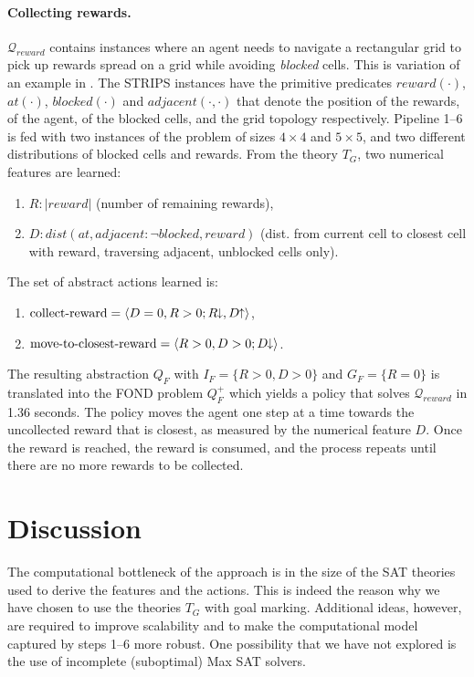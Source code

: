 \documentclass[letterpaper]{article} %
\newcommand{\tup}[1]{\langle #1 \rangle}
\newcommand{\abs}[1]{\ensuremath{\left\vert{#1}\right\vert}}
\newcommand{\Q}{\mathcal{Q}}
\newcommand{\abst}[2]{\tup{#1;#2}}
\newcommand{\pplus}{\hspace{-.05em}\raisebox{.15ex}{\footnotesize$\uparrow$}}
\newcommand{\mminus}{\hspace{-.05em}\raisebox{.15ex}{\footnotesize$\downarrow$}}
\begin{document}
\paragraph{Collecting rewards.}
$\Q_{reward}$ contains instances where  an agent needs to navigate a rectangular
grid to pick up  rewards spread on a grid  while 
avoiding \emph{blocked} cells. This is  variation of an
example  in \cite{garnelo2016towards}. The STRIPS instances have the primitive predicates $reward(\cdot)$, $at(\cdot)$, $blocked(\cdot)$
and $adjacent(\cdot,\cdot)$ that denote the position of the rewards, of
the agent, of the blocked cells, and the grid topology respectively.
Pipeline 1--6  is fed with two instances of the problem of sizes $4 \times 4$
and $5\times 5$, and two different  distributions of blocked cells  and rewards.
From the theory $T_G$, two numerical  features are learned:
\begin{enumerate}[--]
  \item $R: \abs{reward}$ (number of remaining rewards), 
  \item $D: dist(at, adjacent{:}\neg blocked, reward)$ (dist. from current
    cell to closest cell with reward, traversing adjacent, unblocked cells only).
\end{enumerate}
The set of  abstract actions  learned is:
\begin{enumerate}[--]
  \item $\text{collect-reward} = \abst{D=0, R > 0}{R\mminus, D\pplus}$,
  \item $\text{move-to-closest-reward} = \abst{R>0, D>0}{D\mminus}$.
\end{enumerate}

The resulting  abstraction $Q_F$ with $I_F = \{ R>0, D>0 \}$ and $G_F=\{R=0\}$
is translated into the  FOND problem $Q^+_F$ which yields
a policy  that solves $\Q_{reward}$ in 1.36 seconds. The policy moves the agent
one step at a time towards  the uncollected  reward that is closest, as measured by the
numerical feature $D$. Once the reward is reached, the reward is consumed, and
the process repeats until there are no more rewards to be collected. 


\section{Discussion}

The computational  bottleneck of the approach
is  in the size of the SAT  theories used to derive the features
and the actions.
This is indeed the reason why we have chosen to use the theories $T_G$
with goal marking. Additional ideas, however, are required
to improve scalability and to make the computational model
captured by  steps 1--6 more robust. One possibility that we have not explored
is the use of incomplete (suboptimal) Max SAT solvers. 
\end{document}
